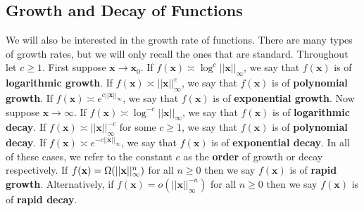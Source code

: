     \subsection*{Growth and Decay of Functions}
      We will also be interested in the growth rate of functions. There are many types of growth rates, but we will only recall the ones that are standard. Throughout let $c \ge 1$. First suppose $\mathbf{x} \to \mathbf{x}_{0}$. If $f(\mathbf{x}) \asymp \log^{c}||\mathbf{x}||_{\infty}$, we say that $f(\mathbf{x})$ is of \textbf{logarithmic growth}. If $f(\mathbf{x}) \asymp ||\mathbf{x}||_{\infty}^{c}$, we say that $f(\mathbf{x})$ is of \textbf{polynomial growth}. If $f(\mathbf{x}) \asymp e^{c||\mathbf{x}||_{\infty}}$, we say that $f(\mathbf{x})$ is of \textbf{exponential growth}. Now suppose $\mathbf{x} \to \infty$. If $f(\mathbf{x}) \asymp \log^{-c}||\mathbf{x}||_{\infty}$, we say that $f(\mathbf{x})$ is of \textbf{logarithmic decay}. If $f(\mathbf{x}) \asymp ||\mathbf{x}||_{\infty}^{-c}$ for some $c \ge 1$, we say that $f(\mathbf{x})$ is of \textbf{polynomial decay}. If $f(\mathbf{x}) \asymp e^{-c||\mathbf{x}||_{\infty}}$, we say that $f(\mathbf{x})$ is of \textbf{exponential decay}. In all of these cases, we refer to the constant $c$ as the \textbf{order} of growth or decay respectively. If $f(\mathbf{x}) = \Omega(||\mathbf{x}||_{\infty}^{n})$ for all $n \ge 0$ then we say $f(\mathbf{x})$ is of \textbf{rapid growth}. Alternatively, if $f(\mathbf{x}) = o(||\mathbf{x}||_{\infty}^{-n})$ for all $n \ge 0$ then we say $f(\mathbf{x})$ is of \textbf{rapid decay}.
